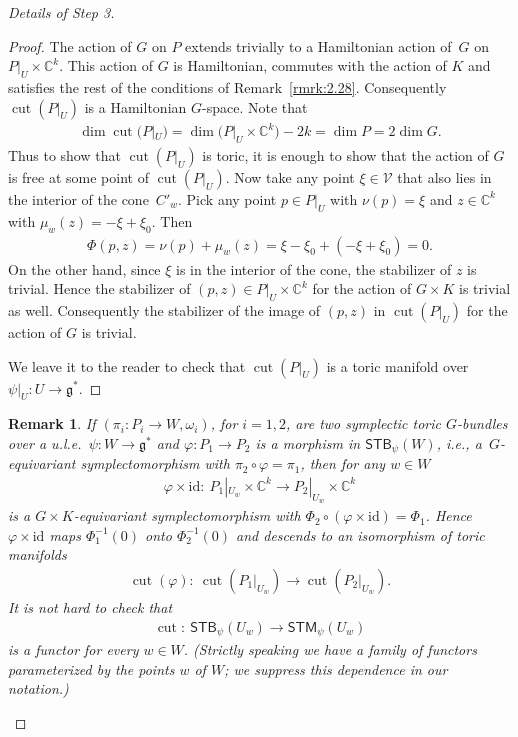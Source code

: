 \documentclass[10pt,a4paper]{amsart}
\numberwithin{equation}{section}
\newtheorem{Remark}[Lemma]{Remark}
\begin{document}
\begin{proof}[Details of Step 3]
\begin{proof}
The action of $G$ on $P$ extends trivially to a Hamiltonian action of~$G$ on $P|_U\times {\mathbb C}^k$.  This action of $G$ is Hamiltonian, commutes
with the action of $K$ and satisf\/ies the rest of the conditions of
Remark~\ref{rmrk:2.28}.  Consequently $\operatorname{cut}(P|_U)$ is a Hamiltonian
$G$-space.  Note that
\begin{gather*}
\dim \operatorname{cut}(P|_U) = \dim \big(P|_U \times {\mathbb C}^k\big) - 2k = \dim P = 2\dim G.
\end{gather*}
Thus to show that $\operatorname{cut}(P|_U)$ is toric, it is enough to show
that the action of $G$ is free at some point of $\operatorname{cut}(P|_U) $.  Now
take any point $\xi \in {\mathcal V}$ that also lies in the interior of the
cone~$C'_w$.  Pick any point $p\in P|_U$ with $\nu(p) = \xi$ and $z\in
{\mathbb C}^k$ with $\mu_w(z) = -\xi +\xi_0$.  Then
\begin{gather*}
\Phi(p,z) = \nu(p)+\mu_w(z) = \xi -\xi_0 +(-\xi +\xi_0) =0.
\end{gather*}
  On the other hand, since
$\xi$ is in the interior of the cone, the stabilizer of $z$ is
trivial.  Hence the stabilizer of $(p,z) \in P|_U\times {\mathbb C}^k$ for the
action of $G\times K$ is trivial as well. Consequently the stabilizer
of the image of $(p,z)$ in $\operatorname{cut}(P|_U)$ for the action of $G$ is
trivial.

We leave it to the reader to check that $\operatorname{cut}(P|_U)$ is a toric
manifold over $\psi|_U\colon U\to {\mathfrak g}^*$.
\end{proof}

\begin{Remark}
  If $(\pi_i\colon P_i\to W, \omega_i)$, for $i=1,2$, are two symplectic toric
  $G$-bundles over a u.l.e.\ $\psi\colon W\to {\mathfrak g}^*$ and
  $\varphi\colon P_1\to P_2$ is a morphism in ${\textsf{STB}}_\psi(W)$, i.e., a~$G$-equivariant symplectomorphism with $\pi_2 \circ \varphi =
  \pi_1$, then for any $w\in W$
\begin{gather*}
\varphi \times \text{id}\colon \  P_1|_{U_w}\times {\mathbb C}^k \to P_2|_{U_w}\times {\mathbb C}^k
\end{gather*}
is a $G\times K$-equivariant symplectomorphism with $\Phi_2\circ
(\varphi \times \text{id}) = \Phi_1$.
Hence $\varphi \times \text{id}$ maps $\Phi_1^{-1} (0)$
onto $\Phi_2^{-1} (0)$ and descends to an isomorphism of toric
manifolds
\begin{gather*}
\operatorname{cut}(\varphi)\colon \ \operatorname{cut}(P_1|_{U_w}) \to \operatorname{cut}(P_2|_{U_w}).
\end{gather*}
It is not hard to check that
\begin{gather*}
\operatorname{cut}\colon \  {\textsf{STB}}_\psi (U_w)\to {\textsf{STM}}_\psi (U_w)
\end{gather*}
is a functor for every $w\in W$.  (Strictly speaking we have a family of
functors parameterized by the points $w$ of $W$; we suppress this
dependence in our notation.)
\end{Remark}


\end{proof}
\end{document}
